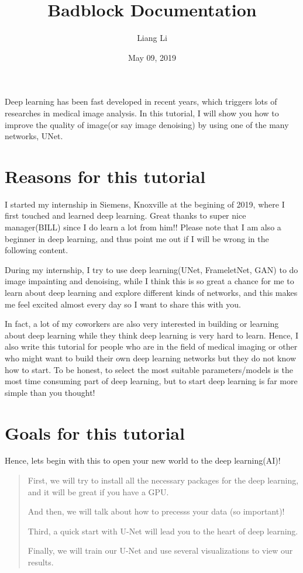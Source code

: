 \documentclass[letterpaper,10pt,english]{sphinxmanual}
\title{Badblock Documentation}
\date{May 09, 2019}
\author{Liang Li}
\begin{document}
\pagestyle{empty}
\maketitle
\pagestyle{plain}
\sphinxtableofcontents
\pagestyle{normal}
\label{\detokenize{index::doc}}


Deep learning has been fast developed in recent years, which triggers lots of researches in medical image analysis. In this tutorial, I will show you
how to improve the quality of image(or say image denoising) by using one of the many networks, UNet.


\chapter{Reasons for this tutorial}
\label{\detokenize{index:reasons-for-this-tutorial}}
I started my internship in Siemens, Knoxville at the begining of 2019, where I first touched and learned deep learning.
Great thanks to super nice manager(BILL) since I do learn a lot from him!! Please note that I am also a beginner in deep learning, and thus point me out if I will be wrong in the following content.

During my internship, I try to use deep learning(UNet, FrameletNet, GAN) to do image impainting and denoising, while I think this is so great a chance for me to learn about deep learning and explore different kinds of networks, and this makes me feel excited almost every day so I want to share this with you.

In fact, a lot of my coworkers are also very interested in building or learning about deep learning while they think
deep learning is very hard to learn. Hence, I also write this tutorial for people who are in the field of medical imaging
or other who might want to build their own deep learning networks but they do not know how to start. To be honest, to select the most suitable parameters/models
is the most time consuming part of deep learning, but to start deep learning is far more simple than you thought!


\chapter{Goals for this tutorial}
\label{\detokenize{index:goals-for-this-tutorial}}
Hence, lets begin with this to open your new world to the deep learning(AI)!
\begin{quote}

First, we will try to install all the necessary packages for the deep learning, and it will be great if you have a GPU.

And then, we will talk about how to precesss your data (so important)!

Third, a quick start with U-Net will lead you to the heart of deep learning.

Finally, we will train our U-Net and use several visualizations to view our results.
\end{quote}
\end{document}
